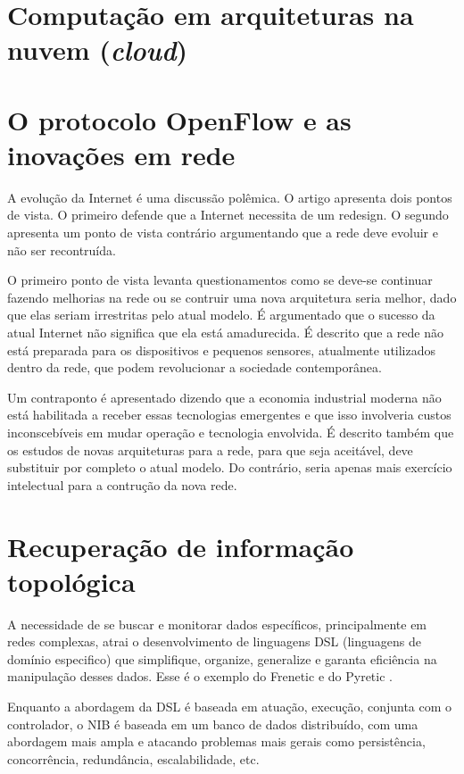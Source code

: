 \section{Computação em arquiteturas na nuvem (\emph{cloud})}

\section{O protocolo OpenFlow e as inovações em rede}

A evolução da Internet é uma discussão polêmica. 
O artigo \citep{jennifer2010future} apresenta dois pontos de vista.
O primeiro defende que a Internet necessita de um redesign. 
O segundo apresenta um ponto de vista contrário argumentando que a rede 
deve evoluir e não ser recontruída.

O primeiro ponto de vista levanta questionamentos como se deve-se continuar
fazendo melhorias na rede ou se contruir uma nova arquitetura seria melhor, 
dado que elas seriam irrestritas pelo atual modelo. 
É argumentado que o sucesso da atual Internet não significa que 
ela está amadurecida. 
É descrito que a rede não está preparada para os dispositivos e 
pequenos sensores, atualmente utilizados dentro da rede, que podem 
revolucionar a sociedade contemporânea.

Um contraponto é apresentado dizendo que a economia industrial moderna não 
está habilitada a receber essas tecnologias emergentes e que isso involveria 
custos inconscebíveis em mudar operação e tecnologia envolvida. 
É descrito também que os estudos de novas arquiteturas para a rede, para que 
seja aceitável, deve substituir por completo o atual modelo. 
Do contrário, seria apenas mais exercício intelectual para a contrução 
da nova rede. 

\section{Recuperação de informação topológica}

A necessidade de se buscar e monitorar dados 
específicos, principalmente em redes complexas, atrai o desenvolvimento
de linguagens DSL (linguagens de domínio especifico) que simplifique, 
organize, generalize e garanta eficiência na manipulação desses dados.
Esse é o exemplo do Frenetic \citep{foster2011frenetic} 
e do Pyretic \citep{monsanto2013composing}.

Enquanto a abordagem da DSL é baseada em atuação, execução,
conjunta com o controlador,
o NIB é baseada em um banco de dados distribuído,
com uma abordagem mais ampla e atacando problemas mais gerais
como persistência, concorrência, redundância, escalabilidade, etc.

